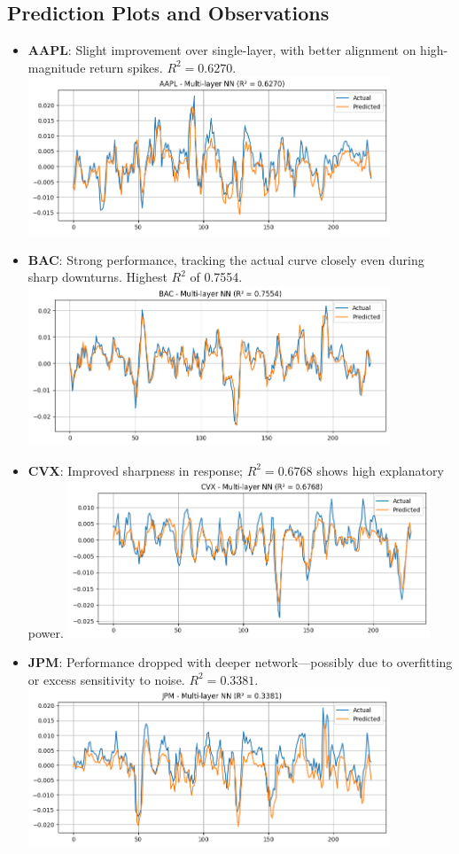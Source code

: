 \documentclass[12pt]{article}
\begin{document}
\subsection{Prediction Plots and Observations}
\begin{itemize}
  \item \textbf{AAPL}: Slight improvement over single-layer, with better alignment on high-magnitude return spikes. $R^2 = 0.6270$.
  \includegraphics[width=0.85\textwidth]{AAPL_multi_layer_nn.png}

  \item \textbf{BAC}: Strong performance, tracking the actual curve closely even during sharp downturns. Highest $R^2$ of 0.7554.
  \includegraphics[width=0.85\textwidth]{BAC_multi_layer_nn.png}

  \item \textbf{CVX}: Improved sharpness in response; $R^2 = 0.6768$ shows high explanatory power.
  \includegraphics[width=0.85\textwidth]{CVX_multi_layer_nn.png}

  \item \textbf{JPM}: Performance dropped with deeper network—possibly due to overfitting or excess sensitivity to noise. $R^2 = 0.3381$.
  \includegraphics[width=0.85\textwidth]{JPM_multi_layer_nn.png}


\end{itemize}
\end{document}
